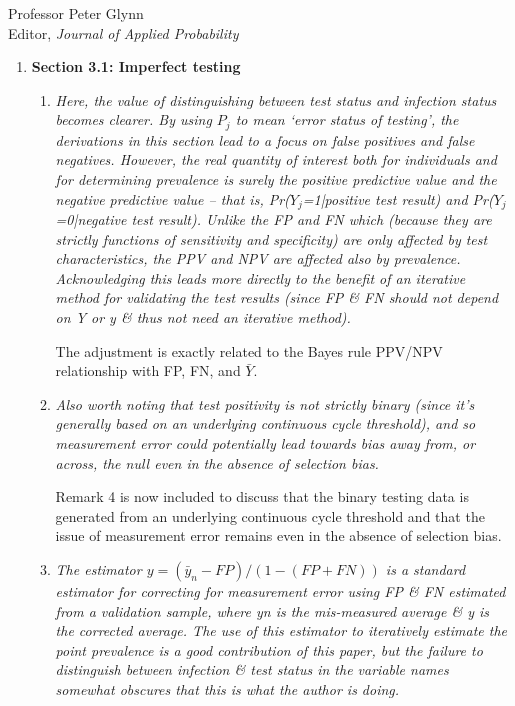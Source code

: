 \documentclass[11pt]{letter} %
\begin{document}
\begin{letter}{Professor
	Peter Glynn\\
	Editor, {\em Journal of Applied Probability}}
\begin{enumerate}
\begin{enumerate}
	\item {\it The “natural candidate for AIR” presented is the quantity that has more commonly been referred to as the “test positivity rate” (assuming that yi does in fact indicate test status rather than infection status which is obviously unknown). It would be helpful to mention this.}
	\vspace{5mm}

	This is now stated explicitly in Section 3, paragraph 2.
\end{enumerate}
\item {\bf Section 3.1: Imperfect testing}
\begin{enumerate}
	\item {\it Here, the value of distinguishing between test status and infection status becomes clearer. By using $P_j$ to mean ‘error status of testing’, the derivations in this section lead to a focus on false positives and false negatives. However, the real quantity of interest both for individuals and for determining prevalence is surely the positive predictive value and the negative predictive value – that is, Pr($Y_j$=1|positive test result) and Pr($Y_j$=0|negative test result). Unlike the FP and FN which (because they are strictly functions of sensitivity and specificity) are only affected by test characteristics, the PPV and NPV are affected also by prevalence. Acknowledging this leads more directly to the benefit of an iterative method for validating the test results (since FP \& FN should not depend on Y or y \& thus not need an iterative method).}
	\vspace{5mm}

	The adjustment is exactly related to the Bayes rule PPV/NPV relationship with FP, FN, and $\bar Y$.
	\vspace{5mm}
	\item {\it Also worth noting that test positivity is not strictly binary (since it’s generally based on an underlying continuous cycle threshold), and so measurement error could potentially lead towards bias away from, or across, the null even in the absence of selection bias.}
	\vspace{5mm}

	Remark 4 is now included to discuss that the binary testing data is generated from an underlying continuous cycle threshold and that the issue of measurement error remains even in the absence of selection bias.
	\vspace{5mm}

	\item {\it The estimator $y = (\bar y_n-FP) /(1-(FP+FN))$ is a standard estimator for correcting for measurement error using FP \& FN estimated from a validation sample, where yn is the mis-measured average \& y is the corrected average. The use of this estimator to iteratively estimate the point prevalence is a good contribution of this paper, but the failure to distinguish between infection \& test status in the variable names somewhat obscures that this is what the author is doing.}
	\vspace{5mm}


\end{enumerate}
\end{enumerate}
\end{letter}
\end{document}
